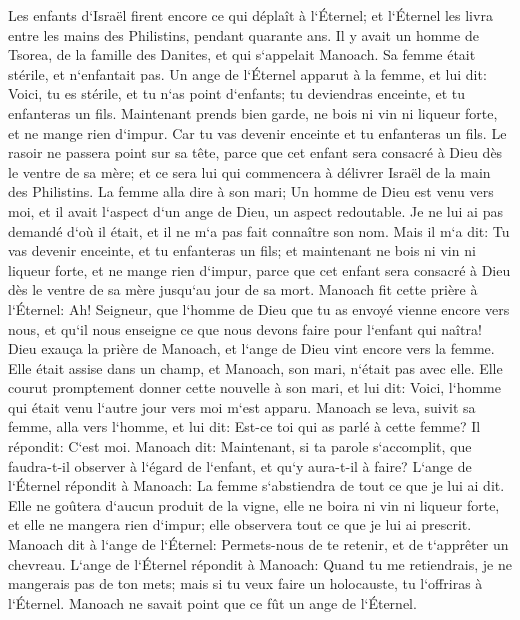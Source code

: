 \verse Les enfants d`Israël firent encore ce qui déplaît à l`Éternel; et l`Éternel les livra entre les mains des Philistins, pendant quarante ans. 
\verse Il y avait un homme de Tsorea, de la famille des Danites, et qui s`appelait Manoach. Sa femme était stérile, et n`enfantait pas. 
\verse Un ange de l`Éternel apparut à la femme, et lui dit: Voici, tu es stérile, et tu n`as point d`enfants; tu deviendras enceinte, et tu enfanteras un fils. 
\verse Maintenant prends bien garde, ne bois ni vin ni liqueur forte, et ne mange rien d`impur. 
\verse Car tu vas devenir enceinte et tu enfanteras un fils. Le rasoir ne passera point sur sa tête, parce que cet enfant sera consacré à Dieu dès le ventre de sa mère; et ce sera lui qui commencera à délivrer Israël de la main des Philistins. 
\verse La femme alla dire à son mari; Un homme de Dieu est venu vers moi, et il avait l`aspect d`un ange de Dieu, un aspect redoutable. Je ne lui ai pas demandé d`où il était, et il ne m`a pas fait connaître son nom. 
\verse Mais il m`a dit: Tu vas devenir enceinte, et tu enfanteras un fils; et maintenant ne bois ni vin ni liqueur forte, et ne mange rien d`impur, parce que cet enfant sera consacré à Dieu dès le ventre de sa mère jusqu`au jour de sa mort. 
\verse Manoach fit cette prière à l`Éternel: Ah! Seigneur, que l`homme de Dieu que tu as envoyé vienne encore vers nous, et qu`il nous enseigne ce que nous devons faire pour l`enfant qui naîtra! 
\verse Dieu exauça la prière de Manoach, et l`ange de Dieu vint encore vers la femme. Elle était assise dans un champ, et Manoach, son mari, n`était pas avec elle. 
\verse Elle courut promptement donner cette nouvelle à son mari, et lui dit: Voici, l`homme qui était venu l`autre jour vers moi m`est apparu. 
\verse Manoach se leva, suivit sa femme, alla vers l`homme, et lui dit: Est-ce toi qui as parlé à cette femme? Il répondit: C`est moi. 
\verse Manoach dit: Maintenant, si ta parole s`accomplit, que faudra-t-il observer à l`égard de l`enfant, et qu`y aura-t-il à faire? 
\verse L`ange de l`Éternel répondit à Manoach: La femme s`abstiendra de tout ce que je lui ai dit. 
\verse Elle ne goûtera d`aucun produit de la vigne, elle ne boira ni vin ni liqueur forte, et elle ne mangera rien d`impur; elle observera tout ce que je lui ai prescrit. 
\verse Manoach dit à l`ange de l`Éternel: Permets-nous de te retenir, et de t`apprêter un chevreau. 
\verse L`ange de l`Éternel répondit à Manoach: Quand tu me retiendrais, je ne mangerais pas de ton mets; mais si tu veux faire un holocauste, tu l`offriras à l`Éternel. Manoach ne savait point que ce fût un ange de l`Éternel. 
